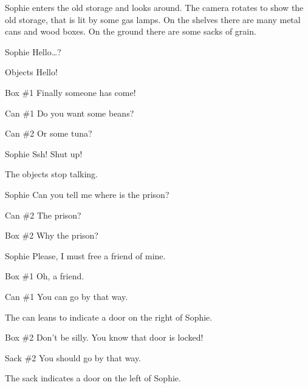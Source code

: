 \begin{screenplay}

Sophie enters the old storage and looks around. The camera rotates to show the old storage, that is lit by some gas lamps. On the shelves there are many metal cans and wood boxes. On the ground there are some sacks of grain.

\begin{dialogue}{Sophie}
Hello…?
\end{dialogue}
\begin{dialogue}[cheerful]{Objects}
 Hello!
\end{dialogue}
\begin{dialogue}{Box \#{}1}
 Finally someone has come!
\end{dialogue}
\begin{dialogue}{Can \#{}1}
 Do you want some beans?
\end{dialogue}
\begin{dialogue}{Can \#{}2}
Or some tuna?
\end{dialogue}
\begin{dialogue}[worried]{Sophie}
Ssh! Shut up!
\end{dialogue}
The objects stop talking.
\begin{dialogue}{Sophie}
Can you tell me where is the prison?
\end{dialogue}
\begin{dialogue}[surprised]{Can \#{}2}
The prison?
\end{dialogue}
\begin{dialogue}[surprised]{Box \#{}2}
Why the prison?
\end{dialogue}
\begin{dialogue}{Sophie}
Please, I must free a friend of mine.
\end{dialogue}
\begin{dialogue}{Box \#{}1}
Oh, a friend.
\end{dialogue}
\begin{dialogue}{Can \#{}1}
You can go by that way.
\end{dialogue}
The can leans to indicate a door on the right of Sophie.
\begin{dialogue}{Box \#{}2}
Don't be silly. You know that door is locked!
\end{dialogue}
\begin{dialogue}{Sack \#{}2}
You should go by that way.
\end{dialogue}
The sack indicates a door on the left of Sophie.

\end{screenplay}
